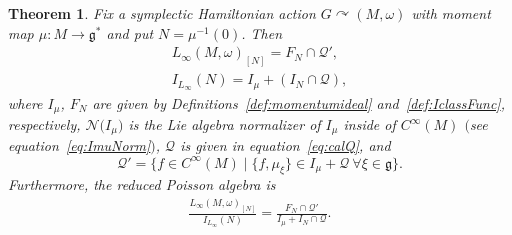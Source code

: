 \documentclass[10pt,a4paper]{amsart}
\numberwithin{equation}{section}
\newtheorem{Theorem}{Theorem}[section]
\DeclareMathOperator{\action}{\curvearrowright}
\newcommand{\g}{\mathfrak{g}}
\begin{document}
\begin{Theorem}\label{thm:LinftyRedSymp}
	Fix a symplectic Hamiltonian action $G\action (M,\omega)$ with moment map $\mu\colon M\to\g^*$ and put $N=\mu^{-1}(0)$.
	Then
	\begin{gather*}
			L_\infty(M,\omega)_{[N]} = F_N \cap \mathcal{Q}', \\
			I_{L_\infty}{(N)} = I_\mu + (I_N \cap \mathcal{Q} ),
	\end{gather*}
	where $I_\mu$, $F_N$ are given by Definitions~{\rm \ref{def:momentumideal}} and~{\rm \ref{def:IclassFunc}}, respectively, $\mathcal{N}\bigl(I_\mu\bigr)$ is the Lie algebra normalizer of $I_\mu$ inside of $C^\infty(M)$ $($see equation~\eqref{eq:ImuNorm}$)$, $\mathcal{Q}$ is given in equation~\eqref{eq:calQ}, and
	\begin{equation}
	\label{eq:calQprime}
	 \mathcal{Q}'=
		\lbrace
			f \in C^\infty(M)
		\mid
			\{ f, \mu_\xi\}\in I_\mu + \mathcal{Q}\  \forall \xi \in \g
		\rbrace		.			
	\end{equation}
	Furthermore, the reduced Poisson algebra is
\begin{align}\label{eq:1plred}
		\frac{L_\infty(M,\omega)_{[N]}}{I_{L_\infty}{(N)}} = \frac{F_N\cap\mathcal{Q}'}{I_\mu+I_N\cap \mathcal{Q}}.
\end{align}
\end{Theorem}
\end{document}
